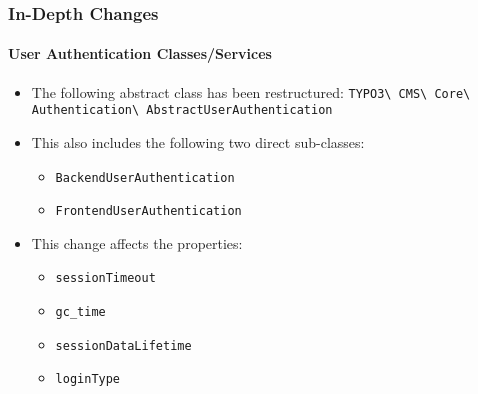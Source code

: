 
\begin{frame}[fragile]
	\frametitle{In-Depth Changes}
	\framesubtitle{User Authentication Classes/Services}

	\begin{itemize}
		\item The following abstract class has been restructured:\newline
			\small\texttt{TYPO3\textbackslash
				CMS\textbackslash
				Core\textbackslash
				Authentication\textbackslash
				AbstractUserAuthentication}\normalsize
		\item This also includes the following two direct sub-classes:

			\begin{itemize}
				\item \texttt{BackendUserAuthentication}
				\item \texttt{FrontendUserAuthentication}
			\end{itemize}

		\item This change affects the properties:

			\begin{itemize}
				\item \texttt{sessionTimeout}
				\item \texttt{gc\_time}
				\item \texttt{sessionDataLifetime}
				\item \texttt{loginType}
			\end{itemize}

	\end{itemize}

\end{frame}


